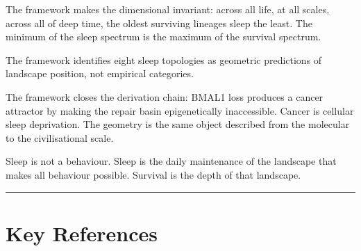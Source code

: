 \documentclass[10pt, a4paper]{article}
\begin{document}
The framework makes the dimensional
invariant: across all life, at all
scales, across all of deep time, the
oldest surviving lineages sleep the
least. The minimum of the sleep spectrum
is the maximum of the survival spectrum.

The framework identifies eight sleep
topologies as geometric predictions
of landscape position, not empirical
categories.

The framework closes the derivation
chain: BMAL1 loss produces a cancer
attractor by making the repair basin
epigenetically inaccessible. Cancer
is cellular sleep deprivation. The
geometry is the same object described
from the molecular to the
civilisational scale.

Sleep is not a behaviour. Sleep is
the daily maintenance of the landscape
that makes all behaviour possible.
Survival is the depth of that
landscape.

\noindent\textcolor{rulecolor}
{\rule{\linewidth}{0.6pt}}

\section*{Key References}
\label{sec:refs}
\end{document}
